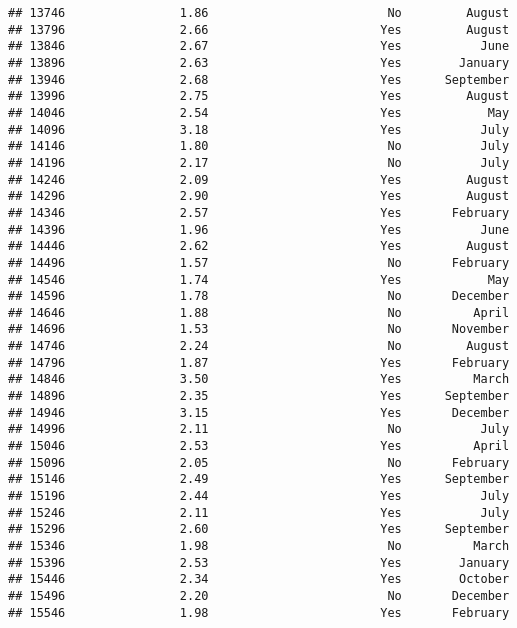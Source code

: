 \documentclass[
]{article}
\begin{document}
\begin{verbatim}
## 13746                1.86                         No         August
## 13796                2.66                        Yes         August
## 13846                2.67                        Yes           June
## 13896                2.63                        Yes        January
## 13946                2.68                        Yes      September
## 13996                2.75                        Yes         August
## 14046                2.54                        Yes            May
## 14096                3.18                        Yes           July
## 14146                1.80                         No           July
## 14196                2.17                         No           July
## 14246                2.09                        Yes         August
## 14296                2.90                        Yes         August
## 14346                2.57                        Yes       February
## 14396                1.96                        Yes           June
## 14446                2.62                        Yes         August
## 14496                1.57                         No       February
## 14546                1.74                        Yes            May
## 14596                1.78                         No       December
## 14646                1.88                         No          April
## 14696                1.53                         No       November
## 14746                2.24                         No         August
## 14796                1.87                        Yes       February
## 14846                3.50                        Yes          March
## 14896                2.35                        Yes      September
## 14946                3.15                        Yes       December
## 14996                2.11                         No           July
## 15046                2.53                        Yes          April
## 15096                2.05                         No       February
## 15146                2.49                        Yes      September
## 15196                2.44                        Yes           July
## 15246                2.11                        Yes           July
## 15296                2.60                        Yes      September
## 15346                1.98                         No          March
## 15396                2.53                        Yes        January
## 15446                2.34                        Yes        October
## 15496                2.20                         No       December
## 15546                1.98                        Yes       February

\end{verbatim}
\end{document}
